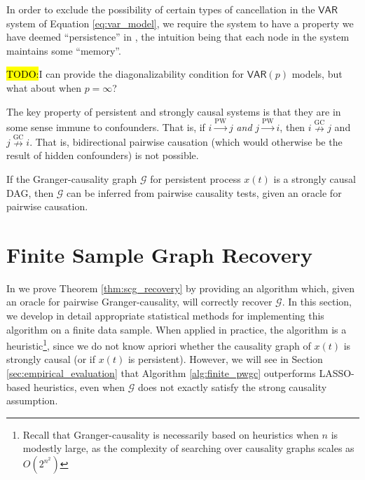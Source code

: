 \documentclass[12pt]{article}
\def\ngc{\overset{\text{GC}}{\nrightarrow}}  %
\def\pwgc{\overset{\text{PW}}{\rightarrow}}  %
\def\gcg{\mathcal{G}}  %
\def\VAR{\mathsf{VAR}}  %
\begin{document}
  In order to exclude the possibility of certain types of cancellation
  in the $\VAR$ system of Equation \eqref{eq:var_model}, we require
  the system to have a property we have deemed ``persistence'' in
  \cite{my_GC_paper}, the intuition being that each node in the system
  maintains some ``memory''.
  
  \begin{definition}[Persistent]
    \hl{TODO:}I can provide the diagonalizability condition for
    $\VAR(p)$ models, but what about when $p = \infty$?
    \todo{persistence for $\VAR(\infty)$}
  \end{definition}

  The key property of persistent and strongly causal systems is that
  they are in some sense immune to confounders.  That is, if $i \pwgc j$
  \textit{and} $j \pwgc i$, then $i \ngc j$ and $j \ngc i$.  That is,
  bidirectional pairwise causation (which would otherwise be the
  result of hidden confounders) is not possible.

  \begin{theorem}
    \label{thm:scg_recovery}
    If the Granger-causality graph $\gcg$ for persistent process
    $x(t)$ is a strongly causal DAG, then $\gcg$ can be inferred from
    pairwise causality tests, given an oracle for pairwise causation.

  \end{theorem}

\section{Finite Sample Graph Recovery}
\label{sec:structure_learning}
In \cite{my_GC_paper} we prove Theorem \ref{thm:scg_recovery} by
providing an algorithm which, given an oracle for pairwise
Granger-causality, will correctly recover $\gcg$.  In this section,
we develop in detail appropriate statistical methods for
implementing this algorithm on a finite data sample.  When applied
in practice, the algorithm is a heuristic\footnote{Recall that
  Granger-causality is necessarily based on heuristics when $n$ is
  modestly large, as the complexity of searching over causality
  graphs scales as $O(2^{n^2})$}, since we do not know apriori
whether the causality graph of $x(t)$ is strongly causal (or if
$x(t)$ is persistent).  However, we will see in Section
\ref{sec:empirical_evaluation} that Algorithm \ref{alg:finite_pwgc}
outperforms LASSO-based heuristics, even when $\gcg$ does not
exactly satisfy the strong causality assumption.
\end{document}
